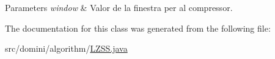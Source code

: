 \begin{DoxyParams}{Parameters}
{\em window} & Valor de la finestra per al compressor. \\
\hline
\end{DoxyParams}


The documentation for this class was generated from the following file\+:\begin{DoxyCompactItemize}
\item 
src/domini/algorithm/\hyperlink{LZSS_8java}{L\+Z\+S\+S.\+java}\end{DoxyCompactItemize}
